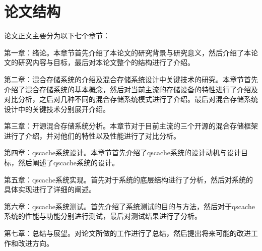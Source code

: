 \section{论文结构}

论文正文主要分为以下七个章节： 

第一章：绪论。本章节首先介绍了本论文的研究背景与研究意义，然后介绍了本论文的研究内容与目标，最后对本论文整个的结构进行了介绍。

第二章：混合存储系统的介绍及混合存储系统设计中关键技术的研究。本章节首先介绍了混合存储系统的基本概念，然后对当前主流的存储设备的特性进行了介绍及对比分析，之后对几种不同的混合存储系统模式进行了介绍。最后对混合存储系统设计中的关键技术分别展开介绍。

第三章：开源混合存储系统分析。本章节对于目前主流的三个开源的混合存储框架进行了介绍，并对他们的特性以及性能进行了对比分析。

第四章：qscache系统设计。本章节首先介绍了qscache系统的设计动机与设计目标，然后阐述了qscache系统的设计。 

第五章：qscache系统实现。首先对于系统的底层结构进行了分析，然后对系统的具体实现进行了详细的阐述。 

第六章：qscache系统测试。首先介绍了系统测试的目的与方法，然后对于qscache系统的性能与功能分别进行测试，最后对测试结果进行了分析。 

第七章：总结与展望。对论文所做的工作进行了总结，然后提出将来可能的改进工作和改进方向。

